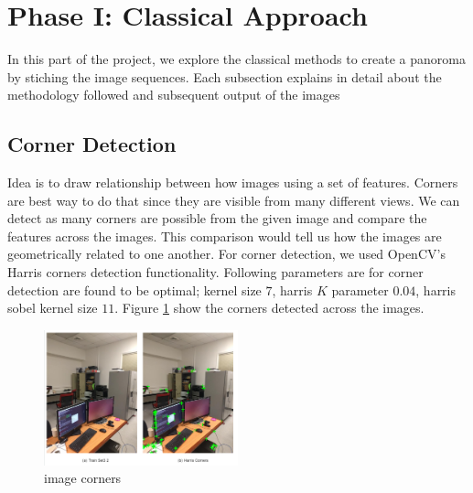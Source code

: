 \documentclass[conference]{IEEEtran}
\begin{document}





%
\IEEEpeerreviewmaketitle



\section{Phase I: Classical Approach}

In this part of the project, we explore the classical methods to create a panoroma by stiching the image sequences. Each subsection explains in detail about the methodology followed and subsequent output of the images

\subsection{Corner Detection}
Idea is to draw relationship between how images using a set of features. Corners are best way to do that since they are visible from many different views. We can detect as many corners are possible from the given image and compare the features across the images. This comparison would tell us how the images are geometrically related to one another. For corner detection, we used OpenCV's Harris corners detection functionality. Following parameters are for corner detection are found to be optimal; kernel size $7$, harris $K$ parameter $0.04$, harris sobel kernel size $11$. Figure \ref{fig:image_corners} show the corners detected across the images.

\begin{figure}[h]
  \centering
  \captionsetup{justification=centering}
  \includegraphics[width=0.5\textwidth]{phase1/imagecorners.png}
  \caption{\label{fig:image_corners}image corners}
\end{figure}
\end{document}
